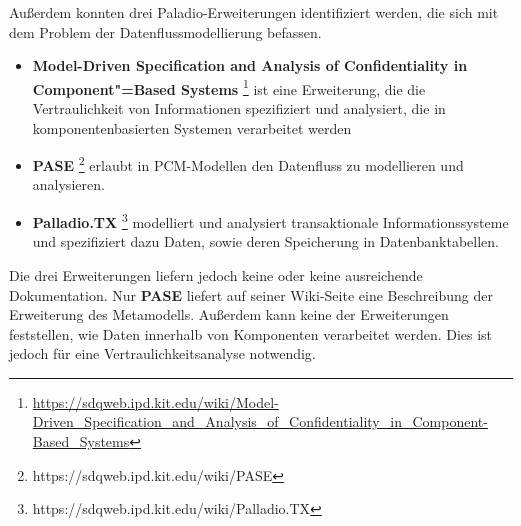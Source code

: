 Außerdem konnten drei Paladio-Erweiterungen identifiziert werden, die sich mit dem Problem der Datenflussmodellierung befassen.
\begin{itemize}
\item \textbf{Model-Driven Specification and Analysis of Confidentiality in Component"=Based Systems} \footnote{\url{https://sdqweb.ipd.kit.edu/wiki/Model-Driven_Specification_and_Analysis_of_Confidentiality_in_Component-Based_Systems}} ist eine Erweiterung, die die Vertraulichkeit von Informationen spezifiziert und analysiert, die in komponentenbasierten Systemen verarbeitet werden
\item \textbf{PASE} \footnote{https://sdqweb.ipd.kit.edu/wiki/PASE} erlaubt in PCM-Modellen den Datenfluss zu modellieren und analysieren.
\item \textbf{Palladio.TX} \footnote{https://sdqweb.ipd.kit.edu/wiki/Palladio.TX} modelliert und analysiert transaktionale Informationssysteme und spezifiziert dazu Daten, sowie deren Speicherung in Datenbanktabellen.
\end{itemize}
Die drei Erweiterungen liefern jedoch keine oder keine ausreichende Dokumentation. Nur \textbf{PASE} liefert auf seiner Wiki-Seite eine Beschreibung der Erweiterung des Metamodells. Außerdem kann keine der Erweiterungen feststellen, wie Daten innerhalb von Komponenten verarbeitet werden. Dies ist jedoch für eine Vertraulichkeitsanalyse notwendig.
 


